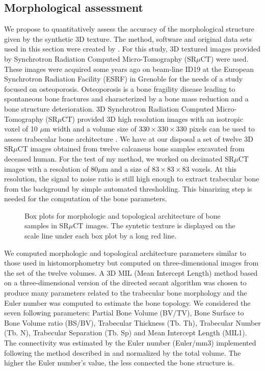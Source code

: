 \subsection{Morphological assessment}
\label{sec:Morphology}

We propose to quantitatively assess the accuracy of the morphological structure given by the 
synthetic 3D texture. 
The method, software and original data sets used in this section were created by \cite{revol2002}.
For this study, %
3D textured images provided by Synchrotron Radiation Computed Micro-Tomography (SR$\mu$CT) were used.
These images were acquired some years ago on beam-line ID19 at the European Synchrotron Radiation Facility 
(ESRF) in Grenoble for the needs of a study focused on osteoporosis. 
Osteoporosis is a bone fragility disease leading to spontaneous bone fractures and 
characterized by a bone mass reduction and a bone structure deterioration. 
3D Synchrotron Radiation Computed Micro-Tomography (SR$\mu$CT) provided 3D high resolution 
images with an isotropic voxel of 10 $\mu$m width and a volume size of 
$330 \times 330 \times 330$ pixels can be used to assess trabecular bone architecture \cite{revol2002}. 
We have at our disposal a set of twelve 3D SR$\mu$CT images obtained from 
twelve calcaneus bone samples excavated from deceased human. 
For the test of my method, we worked on decimated SR$\mu$CT images with a resolution of 
80$\mu$m and a size of $83 \times 83 \times 83$ voxels. 
At this resolution, the signal to noise ratio is still high enough to extract trabecular 
bone from the background by simple automated thresholding. 
This binarizing step is needed for the computation of the bone parameters.

\begin{figure}[h!]
 \centering  
 \caption[Morphological evaluation of SR$\mu$CT texture.]{Box plots for morphologic and topological architecture of bone samples in SR$\mu$CT images. The syntetic 
          texture is displayed on the scale line under each box plot by a long red line.}
 \label{fig:bone_parametresMuCT} 
\end{figure}

We computed morphologic and topological architecture parameters similar to those used in histomorphometry 
but computed on three-dimensional images from the set of the twelve volumes. 
A 3D MIL (Mean Intercept Length) method based on a three-dimensional version of the directed 
secant algorithm was chosen to produce many parameters related to the trabecular 
bone morphology \cite{Hipp97} and the Euler number was computed to estimate the bone topology. 
We considered the seven following parameters: Partial Bone Volume (BV/TV), Bone Surface to 
Bone Volume ratio (BS/BV), Trabecular Thickness (Tb. Th), Trabecular Number (Tb. N), 
Trabecular Separation (Tb. Sp) and Mean Intercept Length (MIL1). The connectivity was estimated by the Euler number 
(Euler/mm3) implemented following the method described in 
\cite{Odgaard93} and normalized by the total volume. 
The higher the Euler number's value, the less connected the bone structure is.

